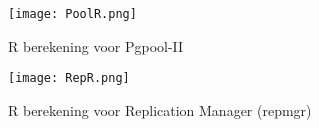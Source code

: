 \begin{figure}[!h]
    \centering
    \texttt{[image: PoolR.png]}
    \caption{R berekening voor Pgpool-II}
    \label{fig:R berekening voor Pgpool-II}
\end{figure}

\begin{figure}[!h]
    \centering
    \texttt{[image: RepR.png]}
    \caption{R berekening voor Replication Manager (repmgr)}
    \label{fig:R berekening voor Replication Manager (repmgr)}
\end{figure}





